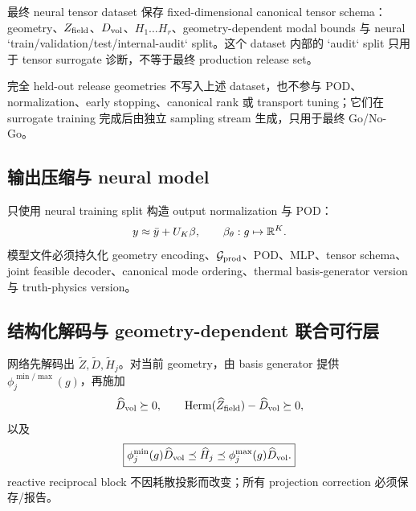 最终 neural tensor dataset 保存 fixed-dimensional canonical tensor schema：geometry、$Z_{\rm field}$、$D_{\rm vol}$、$H_1\ldots H_r$、geometry-dependent modal bounds 与 neural `train/validation/test/internal-audit` split。这个 dataset 内部的 `audit` split 只用于 tensor surrogate 诊断，不等于最终 production release set。

完全 held-out release geometries 不写入上述 dataset，也不参与 POD、normalization、early stopping、canonical rank 或 transport tuning；它们在 surrogate training 完成后由独立 sampling stream 生成，只用于最终 Go/No-Go。

\subsection{输出压缩与 neural model}
只使用 neural training split 构造 output normalization 与 POD：
\begin{equation}
y\approx\bar y+U_K\beta,
\qquad
\beta_\theta:g\mapsto\mathbb{R}^K.
\end{equation}
模型文件必须持久化 geometry encoding、$\mathcal G_{\rm prod}$、POD、MLP、tensor schema、joint feasible decoder、canonical mode ordering、thermal basis-generator version 与 truth-physics version。

\subsection{结构化解码与 geometry-dependent 联合可行层}
网络先解码出 $\widetilde Z,\widetilde D,\widetilde H_j$。对当前 geometry，由 basis generator 提供 $\phi_j^{\min/\max}(g)$，再施加
\begin{equation}
\widehat D_{\rm vol}\succeq0,
\qquad
\operatorname{Herm}(\widehat Z_{\rm field})-\widehat D_{\rm vol}\succeq0,
\end{equation}
以及
\begin{equation}
\boxed{
\phi_j^{\min}(g)\widehat D_{\rm vol}
\preceq\widehat H_j
\preceq\phi_j^{\max}(g)\widehat D_{\rm vol}.
}
\end{equation}
reactive reciprocal block 不因耗散投影而改变；所有 projection correction 必须保存/报告。


